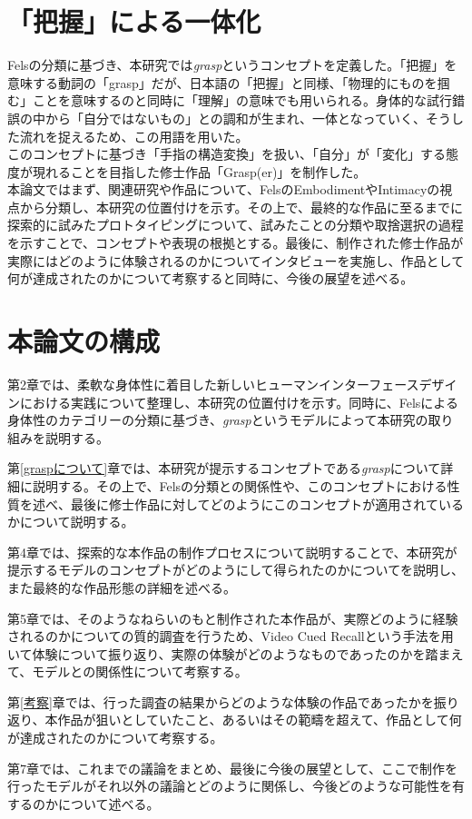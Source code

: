 \section*{「把握」による一体化}
Felsの分類に基づき、本研究では\textit{grasp}というコンセプトを定義した。「把握」を意味する動詞の「grasp」だが、日本語の「把握」と同様、「物理的にものを掴む」ことを意味するのと同時に「理解」の意味でも用いられる。身体的な試行錯誤の中から「自分ではないもの」との調和が生まれ、一体となっていく、そうした流れを捉えるため、この用語を用いた。\\
このコンセプトに基づき「手指の構造変換」を扱い、「自分」が「変化」する態度が現れることを目指した修士作品「Grasp(er)」を制作した。\\
本論文ではまず、関連研究や作品について、FelsのEmbodimentやIntimacyの視点から分類し、本研究の位置付けを示す。その上で、最終的な作品に至るまでに探索的に試みたプロトタイピングについて、試みたことの分類や取捨選択の過程を示すことで、コンセプトや表現の根拠とする。最後に、制作された修士作品が実際にはどのように体験されるのかについてインタビューを実施し、作品として何が達成されたのかについて考察すると同時に、今後の展望を述べる。

\section{本論文の構成}
第2章では、柔軟な身体性に着目した新しいヒューマンインターフェースデザインにおける実践について整理し、本研究の位置付けを示す。同時に、Felsによる身体性のカテゴリーの分類に基づき、\textit{grasp}というモデルによって本研究の取り組みを説明する。

第\ref{graspについて}章では、本研究が提示するコンセプトである\textit{grasp}について詳細に説明する。その上で、Felsの分類との関係性や、このコンセプトにおける性質を述べ、最後に修士作品に対してどのようにこのコンセプトが適用されているかについて説明する。

第4章では、探索的な本作品の制作プロセスについて説明することで、本研究が提示するモデルのコンセプトがどのようにして得られたのかについてを説明し、また最終的な作品形態の詳細を述べる。

第5章では、そのようなねらいのもと制作された本作品が、実際どのように経験されるのかについての質的調査を行うため、Video Cued Recallという手法を用いて体験について振り返り、実際の体験がどのようなものであったのかを踏まえて、モデルとの関係性について考察する。

第\ref{考察}章では、行った調査の結果からどのような体験の作品であったかを振り返り、本作品が狙いとしていたこと、あるいはその範疇を超えて、作品として何が達成されたのかについて考察する。

第7章では、これまでの議論をまとめ、最後に今後の展望として、ここで制作を行ったモデルがそれ以外の議論とどのように関係し、今後どのような可能性を有するのかについて述べる。